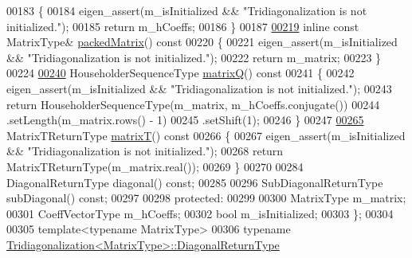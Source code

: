 \begin{DoxyCode}
00183 \textcolor{keyword}{    }\{
00184       eigen\_assert(m\_isInitialized && \textcolor{stringliteral}{"Tridiagonalization is not initialized."});
00185       \textcolor{keywordflow}{return} m\_hCoeffs;
00186     \}
00187 
\hyperlink{group___eigenvalues___module_a47858b3895e64acafb1bb2e97f98a154}{00219}     \textcolor{keyword}{inline} \textcolor{keyword}{const} MatrixType& \hyperlink{group___eigenvalues___module_a47858b3895e64acafb1bb2e97f98a154}{packedMatrix}()\textcolor{keyword}{ const}
00220 \textcolor{keyword}{    }\{
00221       eigen\_assert(m\_isInitialized && \textcolor{stringliteral}{"Tridiagonalization is not initialized."});
00222       \textcolor{keywordflow}{return} m\_matrix;
00223     \}
00224 
\hyperlink{group___eigenvalues___module_a000f7392eda930576ffd2af1fae54af2}{00240}     HouseholderSequenceType \hyperlink{group___eigenvalues___module_a000f7392eda930576ffd2af1fae54af2}{matrixQ}()\textcolor{keyword}{ const}
00241 \textcolor{keyword}{    }\{
00242       eigen\_assert(m\_isInitialized && \textcolor{stringliteral}{"Tridiagonalization is not initialized."});
00243       \textcolor{keywordflow}{return} HouseholderSequenceType(m\_matrix, m\_hCoeffs.conjugate())
00244              .setLength(m\_matrix.rows() - 1)
00245              .setShift(1);
00246     \}
00247 
\hyperlink{group___eigenvalues___module_a6eb5ef94b8b9bb013c0e69b6df56d0df}{00265}     MatrixTReturnType \hyperlink{group___eigenvalues___module_a6eb5ef94b8b9bb013c0e69b6df56d0df}{matrixT}()\textcolor{keyword}{ const}
00266 \textcolor{keyword}{    }\{
00267       eigen\_assert(m\_isInitialized && \textcolor{stringliteral}{"Tridiagonalization is not initialized."});
00268       \textcolor{keywordflow}{return} MatrixTReturnType(m\_matrix.real());
00269     \}
00270 
00284     DiagonalReturnType diagonal() \textcolor{keyword}{const};
00285 
00296     SubDiagonalReturnType subDiagonal() \textcolor{keyword}{const};
00297 
00298   \textcolor{keyword}{protected}:
00299 
00300     MatrixType m\_matrix;
00301     CoeffVectorType m\_hCoeffs;
00302     \textcolor{keywordtype}{bool} m\_isInitialized;
00303 \};
00304 
00305 \textcolor{keyword}{template}<\textcolor{keyword}{typename} MatrixType>
00306 \textcolor{keyword}{typename} \hyperlink{class_eigen_1_1internal_1_1_tensor_lazy_evaluator_writable}{Tridiagonalization<MatrixType>::DiagonalReturnType}

\end{DoxyCode}
